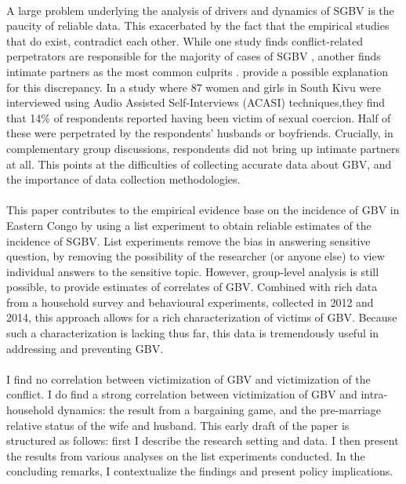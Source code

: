 \documentclass[11pt,a4paper]{scrartcl} %
\begin{document}
\paragraph{}
A large problem underlying the analysis of drivers and dynamics of SGBV is the paucity of reliable data. This exacerbated by the fact that the empirical studies that do exist, contradict each other. While one study finds conflict-related perpetrators are responsible for the majority of cases of SGBV \citep{Johnson2010}, another finds intimate partners as the most common culprits \citep{Peterman2011}. \citet{Stark2017} provide a possible explanation for this discrepancy. In a study where 87 women and girls in South Kivu were interviewed using Audio Assisted Self-Interviews (ACASI) techniques,they find that 14\% of respondents reported having been victim of sexual coercion. Half of these were perpetrated by the respondents' husbands or boyfriends. Crucially, in complementary group discussions, respondents did not bring up intimate partners at all. This points at the difficulties of collecting accurate data about GBV, and the importance of data collection methodologies. 

\paragraph{}
This paper contributes to the empirical evidence base on the incidence of GBV in Eastern Congo by using a list experiment to obtain reliable estimates of the incidence of SGBV. List experiments remove the bias in answering sensitive question, by removing the possibility of the researcher (or anyone else) to view individual answers to the sensitive topic. However, group-level analysis is still possible, to provide estimates of correlates of GBV. Combined with rich data from a household survey and behavioural experiments, collected in 2012 and 2014, this approach allows for a rich characterization of victims of GBV. Because such a characterization is lacking thus far, this data is tremendously useful in addressing and preventing GBV.

\paragraph{}
I find no correlation between victimization of GBV and victimization of the conflict. I do find a strong correlation between victimization of GBV and intra-household dynamics: the result from a bargaining game, and the pre-marriage relative status of the wife and husband. This early draft of the paper is structured as follows: first I describe the research setting and data. I then present the results from various analyses on the list experiments conducted. In the concluding remarks, I contextualize the findings and present policy implications.
\end{document}
